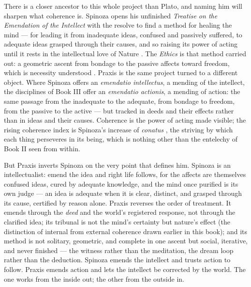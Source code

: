 There is a closer ancestor to this whole project than Plato, and naming him will
sharpen what coherence is. Spinoza opens his unfinished \emph{Treatise on the
Emendation of the Intellect} with the resolve to find a method for healing the
mind --- for leading it from inadequate ideas, confused and passively suffered, to
adequate ideas grasped through their causes, and so raising its power of acting
until it rests in the intellectual love of Nature \parencite{spinoza1985emendation}.
The \emph{Ethics} is that method carried out: a geometric ascent from bondage to
the passive affects toward freedom, which is necessity understood
\parencite[V.P42]{spinoza1994ethics}. Praxis is the same project turned to a
different object. Where Spinoza offers an \emph{emendatio intellectus}, a mending
of the intellect, the disciplines of Book III offer an \emph{emendatio actionis},
a mending of action: the same passage from the inadequate to the adequate, from
bondage to freedom, from the passive to the active --- but tracked in deeds and
their effects rather than in ideas and their causes. Coherence is the power of
acting made visible; the rising coherence index is Spinoza's increase of
\emph{conatus} \parencite[III.P6--P7]{spinoza1994ethics}, the striving by which
each thing perseveres in its being, which is nothing other than the entelechy of
Book II seen from within.

But Praxis inverts Spinoza on the very point that defines him. Spinoza is an
intellectualist: emend the idea and right life follows, for the affects are
themselves confused ideas, cured by adequate knowledge, and the mind once purified
is its own judge --- an idea is adequate when it is clear, distinct, and grasped
through its cause, certified by reason alone. Praxis reverses the order of
treatment. It emends through the \emph{deed} and the world's registered response,
not through the clarified idea; its tribunal is not the mind's certainty but
nature's effect (the distinction of internal from external coherence drawn earlier
in this book); and its method is not solitary, geometric, and complete in one
ascent but social, iterative, and never finished --- the witness rather than the
meditation, the dream loop rather than the deduction. Spinoza emends the intellect
and trusts action to follow. Praxis emends action and lets the intellect be
corrected by the world. The one works from the inside out; the other from the
outside in.

